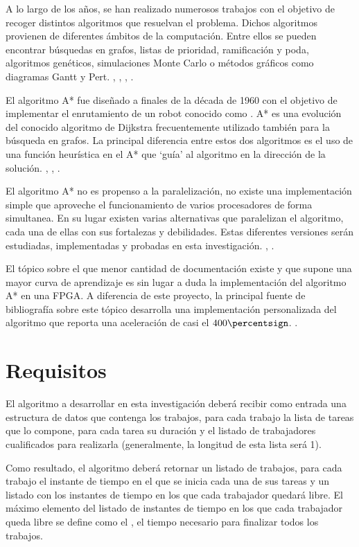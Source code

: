 A lo largo de los años, se han realizado numerosos trabajos con el objetivo
de recoger distintos algoritmos que resuelvan el problema.
Dichos algoritmos provienen de diferentes ámbitos de la computación.
Entre ellos se pueden encontrar búsquedas en grafos,
listas de prioridad, ramificación y poda, algoritmos genéticos,
simulaciones Monte Carlo o
métodos gráficos como diagramas Gantt y Pert.
\cite{Yan77}, \cite{Nil69}, \cite{KTM99}, \cite{BC22}.

El algoritmo A* fue diseñado a finales de la década de 1960
con el objetivo de implementar el enrutamiento de un robot
conocido como  \cite{Nil84}.
A* es una evolución del conocido algoritmo de Dijkstra
frecuentemente utilizado también para la búsqueda en grafos.
La principal diferencia entre estos dos algoritmos es el
uso de una función heurística en el A* que `guía' al algoritmo
en la dirección de la solución.
\cite{HNR68}, \cite{MSV13}, \cite{Kon14}.

El algoritmo A* no es propenso a la paralelización,
no existe una implementación simple que aproveche el funcionamiento de
varios procesadores de forma simultanea.
En su lugar existen varias alternativas que paralelizan el algoritmo,
cada una de ellas con sus fortalezas y debilidades.
Estas diferentes versiones serán estudiadas, implementadas y
probadas en esta investigación.
\cite{Zag17}, \cite{WH16}.

El tópico sobre el que menor cantidad de documentación existe
y que supone una mayor curva de aprendizaje es sin lugar a duda
la implementación del algoritmo A* en una FPGA.
A diferencia de este proyecto, la principal fuente de bibliografía
sobre este tópico desarrolla una implementación personalizada del algoritmo
que reporta una aceleración de casi el $400\percentsign$.
\cite{ZJW20}.

\section{Requisitos}

El algoritmo a desarrollar en esta investigación deberá recibir como entrada
una estructura de datos que contenga los trabajos,
para cada trabajo la lista de tareas que lo compone,
para cada tarea su duración y el listado de trabajadores cualificados para realizarla
(generalmente, la longitud de esta lista será 1).

Como resultado, el algoritmo deberá retornar un listado de trabajos,
para cada trabajo el instante de tiempo en el que se inicia cada una de sus tareas
y un listado con los instantes de tiempo en los que cada trabajador quedará libre.
El máximo elemento del listado de instantes de tiempo en los que cada trabajador queda libre
se define como el , el tiempo necesario para finalizar todos los trabajos.

